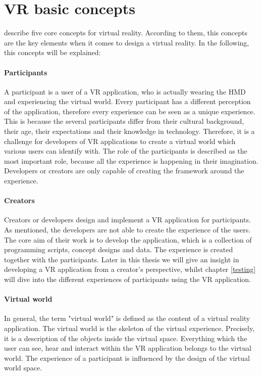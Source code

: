\section{VR basic concepts}
\cite{Sherman.2019} describe five core concepts for virtual reality.  According to them, this concepts are the key elements when it comes to design a virtual reality. In the following, this concepts will be explained:
\paragraph{Participants} A participant is a user of a VR application, who is actually wearing the HMD and experiencing the virtual world. Every participant has a different perception of the application, therefore every experience can be seen as a unique experience. This is because the several participants differ from their cultural background, their age, their expectations and their knowledge in technology. Therefore, it is a challenge for developers of VR applications to create a virtual world which various users can identify with. The role of the participants is described as the most important role, because all the experience is happening in their imagination. Developers or creators are only capable of creating the framework around the experience.
\paragraph{Creators} Creators or developers design and implement a VR application for participants. As mentioned, the developers are not able to create the experience of the users. The core aim of their work is to develop the application, which is a collection of programming scripts, concept designs and data. The experience is created together with the participants. Later in this thesis we will give an insight in developing a VR application from a creator's perspective, whilst chapter \ref{testing} will dive into the different experiences of participants using the VR application.
\paragraph{Virtual world} In general, the term "virtual world" is defined as the content of a virtual reality application.  The virtual world is the skeleton of the virtual experience. Precisely, it is a description of the objects inside the virtual space. Everything which the user can see, hear and interact within the VR application belongs to the virtual world. The experience of a participant is influenced by the design of the virtual world space.

